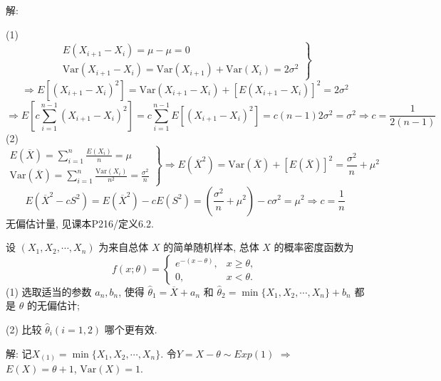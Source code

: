 \documentclass[standard]{ExBook}
\renewenvironment{shaded}{%
  \def\FrameCommand{\fboxsep=\FrameSep \colorbox{shadecolor}}%
  \MakeFramed{\advance\hsize-\width \FrameRestore}%
}{%
  \endMakeFramed
}
\begin{document}
\begin{qitems}
\vspace{\dimexpr2.5cm-5em\relax}

解: 

(1)
$$
\left.
\begin{array}{r}
    E(X_{i+1} - X_i) = \mu - \mu = 0\\
    \text{Var}(X_{i+1} - X_i) = \text{Var}(X_{i+1}) + \text{Var}(X_i) = 2\sigma^2
\end{array}
\right\}
$$
$$
\Longrightarrow
E\left[(X_{i+1} - X_i)^2\right]
=
\text{Var}(X_{i+1} - X_i) + [E(X_{i+1} - X_i)]^2
=
2\sigma^2
$$
$$
\Longrightarrow
E\left[c \sum_{i=1}^{n-1} (X_{i+1} - X_i)^2\right]
= c \sum_{i=1}^{n-1} E\left[(X_{i+1} - X_i)^2\right]
= c (n-1) 2\sigma^2
= \sigma^2
\Longrightarrow
c = \frac{1}{2(n-1)}
$$
(2)
$$
\left.
\begin{array}{r}
    E(\overline{X}) = \sum_{i=1}^n \frac{E(X_i)}{n} = \mu\\
    \text{Var}(\overline{X}) = \sum_{i=1}^n \frac{\text{Var}(X_i)}{n^2} = \frac{\sigma^2}{n}
\end{array}
\right\}
\Longrightarrow
E(\overline{X}^2) = \text{Var}(\overline{X}) + [E(\overline{X})]^2 = \frac{\sigma^2}{n} + \mu^2
$$
$$
E\left(\overline{X}^2 - c S^2\right)
=
E(\overline{X}^2) - c E(S^2)
=
\left(\frac{\sigma^2}{n} + \mu^2\right) - c \sigma^2
= \mu^2
\Longrightarrow
c = \frac{1}{n}
$$
\textcolor{themeColor}{\selectfont {} 无偏估计量, 见课本P216/定义6.2.}

\vspace{2.5cm-5em}

    \begin{bbox}
    \begin{shaded}
        \qitem
设 \((X_1, X_2, \cdots, X_n)\) 为来自总体 \(X\) 的简单随机样本, 总体 \(X\) 的概率密度函数为
\[f(x;\theta) = 
\begin{cases} 
e^{-(x-\theta)}, & x \geq \theta, \\
0, & x < \theta.
\end{cases}\]
(1) 选取适当的参数 \(a_n, b_n\), 使得 \(\hat{\theta}_1 = \overline{X} + a_n\) 和 \(\hat{\theta}_2 = \min\{X_1, X_2, \cdots, X_n\} + b_n\) 都是 \(\theta\) 的无偏估计;

(2) 比较 \(\hat{\theta}_i(i=1,2)\) 哪个更有效.
    \end{shaded}
    \end{bbox}

\vspace{\dimexpr2.5cm-5em\relax}

解: 记$X_{(1)}=\min\{X_1,X_2,\cdots,X_n\}$. 令$Y=X-\theta\sim Exp(1)$ $\Longrightarrow$ $E(X)=\theta+1$, $\mathrm{Var}(X)=1$.


\end{qitems}
\end{document}
